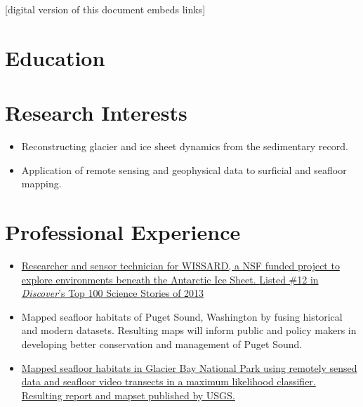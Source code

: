 \documentclass{cv_TOH}
\begin{document}
\vspace{-0.2cm}
\centerline{\footnotesize{[digital version of this document embeds links]}}

\section{Education}

\section{Research Interests}
\begin{itemize}
\item Reconstructing glacier and ice sheet dynamics from the sedimentary record.
\item Application of remote sensing and geophysical data to surficial and seafloor mapping. 
\end{itemize}

\section{Professional Experience}

\begin{itemize}
\item \href{http://www.wissard.org}{Researcher and sensor technician for WISSARD, a NSF funded project to explore environments beneath the Antarctic Ice Sheet. }\href{http://discovermagazine.com/2014/jan-feb/12-the-search-for-life-trapped-under-ice}{Listed \#12 in \textit{Discover}'s Top 100 Science Stories of 2013}
\item Mapped seafloor habitats of Puget Sound, Washington by fusing historical and modern datasets. Resulting maps will inform public and policy makers in developing better conservation and management of Puget Sound.
\item \href{http://pubs.usgs.gov/sim/3253/}{Mapped seafloor habitats in Glacier Bay National Park using remotely sensed data and seafloor video transects in a maximum likelihood classifier. Resulting report and mapset published by USGS.}
\end{itemize}
\end{document}
